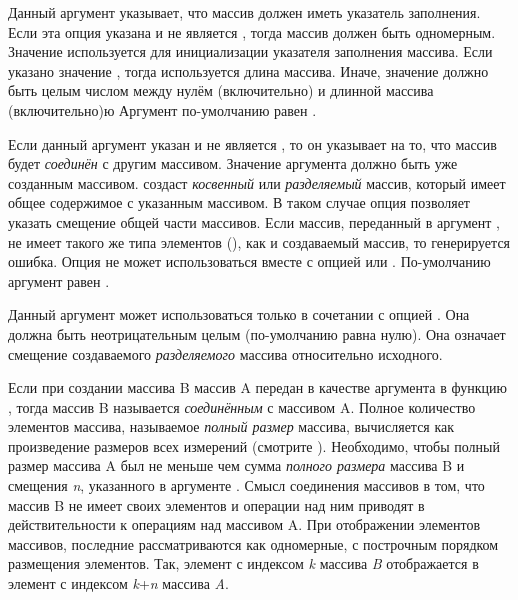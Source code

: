 \begin{defun}[Функция]
\begin{flushdesc}
\item[\cd{:fill-pointer}]
Данный аргумент указывает, что массив должен иметь указатель заполнения.
Если эта опция указана и не является {\false}, тогда массив должен быть
одномерным.
Значение используется для инициализации указателя заполнения массива.
Если указано значение {\true}, тогда используется длина массива.
Иначе, значение должно быть целым числом между нулём (включительно) и длинной
массива (включительно)ю
Аргумент по-умолчанию равен {\nil}.

\item[\cd{:displaced-to}]
Если данный аргумент указан и не является {\false}, то он указывает на то, что
массив будет \emph{соединён} с другим массивом.
Значение аргумента должно быть уже созданным массивом.
 создаст \emph{косвенный} или \emph{разделяемый} массив, который
имеет общее содержимое с указанным массивом. В таком случае опция
 позволяет указать смещение общей части массивов.
Если массив, переданный в аргумент , не имеет такого же типа
элементов (), как и создаваемый массив, то генерируется
ошибка.
Опция  не может использоваться вместе с опцией 
или .
По-умолчанию аргумент равен {\nil}.

\item[\cd{:displaced-index-offset}]
Данный аргумент может использоваться только в сочетании с опцией
.
Она должна быть неотрицательным целым (по-умолчанию равна нулю). Она означает
смещение создаваемого \emph{разделяемого} массива относительно исходного.

Если при создании массива B массив A передан в качестве аргумента
 в функцию , тогда массив B называется
\emph{соединённым} с массивом A. Полное количество элементов массива, называемое
\emph{полный размер} массива, вычисляется как произведение размеров всех
измерений (смотрите ).
Необходимо, чтобы полный размер массива A был не меньше чем сумма \emph{полного
  размера} массива B и смещения \emph{n}, указанного в аргументе
.
Смысл соединения массивов в том, что массив B не имеет своих элементов и
операции над ним приводят в действительности к операциям над массивом A.
При отображении элементов массивов, последние рассматриваются как одномерные, с
построчным порядком размещения элементов.
Так, элемент с индексом \emph{k} массива \emph{B} отображается в элемент с
индексом \emph{k}+\emph{n} массива \emph{A}.
\end{flushdesc}


\end{defun}
